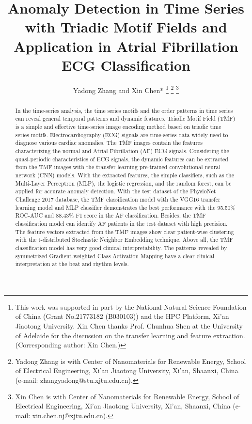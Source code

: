 \documentclass[journal]{IEEEtran}
\begin{document}
\title{Anomaly Detection in Time Series with Triadic Motif Fields and Application in Atrial Fibrillation ECG Classification}
\author{Yadong Zhang and Xin Chen*
\thanks{This work was supported in part by the National Natural Science Foundation of China (Grant No.21773182 (B030103)) and the HPC Platform, Xi'an Jiaotong University. Xin Chen thanks Prof. Chunhua Shen at the University of Adelaide for the discussion on the transfer learning and feature extraction. (Corresponding author: Xin Chen.)}
\thanks{Yadong Zhang is with Center of Nanomaterials for Renewable Energy, School of Electrical Engineering, Xi'an Jiaotong University, Xi'an, Shaanxi, China (e-mail: zhangyadong@stu.xjtu.edu.cn). }
\thanks{Xin Chen is with Center of Nanomaterials for Renewable Energy, School of Electrical Engineering, Xi'an Jiaotong University, Xi'an, Shaanxi, China (e-mail: xin.chen.nj@xjtu.edu.cn). }
}

\maketitle

\begin{abstract}
In the time-series analysis, the time series motifs and the order patterns in time series can reveal general temporal patterns and dynamic features. Triadic Motif Field (TMF) is a simple and effective time-series image encoding method based on triadic time series motifs. Electrocardiography (ECG) signals are time-series data widely used to diagnose various cardiac anomalies. The TMF images contain the features characterizing the normal and Atrial Fibrillation (AF) ECG signals. Considering the quasi-periodic characteristics of ECG signals, the dynamic features can be extracted from the TMF images with the transfer learning pre-trained convolutional neural network (CNN) models. With the extracted features, the simple classifiers, such as the Multi-Layer Perceptron (MLP), the logistic regression, and the random forest, can be applied for accurate anomaly detection. With the test dataset of the PhysioNet Challenge 2017 database, the TMF classification model with the VGG16 transfer learning model and MLP classifier demonstrates the best performance with the 95.50\% ROC-AUC and 88.43\% F1 score in the AF classification. Besides, the TMF classification model can identify AF patients in the test dataset with high precision. The feature vectors extracted from the TMF images show clear patient-wise clustering with the t-distributed Stochastic Neighbor Embedding technique. Above all, the TMF classification model has very good clinical interpretability. The patterns revealed by symmetrized Gradient-weighted Class Activation Mapping have a clear clinical interpretation at the beat and rhythm levels.
\end{abstract}
\end{document}

